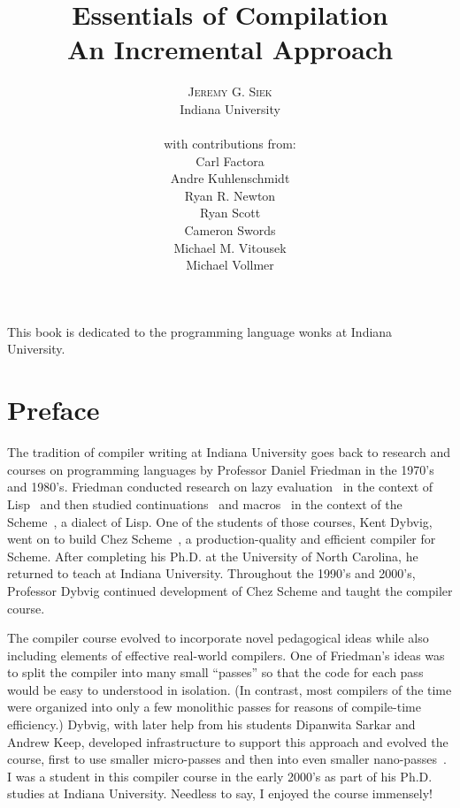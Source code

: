 \documentclass[11pt]{book}
\title{\Huge \textbf{Essentials of Compilation} \\
  \huge An Incremental Approach}
\author{\textsc{Jeremy G. Siek} \\
  Indiana University \\
  \\
  with contributions from: \\
  Carl Factora \\
  Andre Kuhlenschmidt \\
  Ryan R. Newton \\
  Ryan Scott \\
  Cameron Swords \\
  Michael M. Vitousek \\
  Michael Vollmer 
   }
\newenvironment{dedication}
{
   \cleardoublepage
   \thispagestyle{empty}
   \vspace*{\stretch{1}}
   \hfill\begin{minipage}[t]{0.66\textwidth}
   \raggedright
}
{
   \end{minipage}
   \vspace*{\stretch{3}}
   \clearpage
}
\begin{document}
\frontmatter
\maketitle

\begin{dedication}
This book is dedicated to the programming language wonks at Indiana
University.
\end{dedication}

\tableofcontents
\listoffigures

\mainmatter

\chapter*{Preface}

The tradition of compiler writing at Indiana University goes back to
research and courses on programming languages by Professor Daniel
Friedman in the 1970's and 1980's. Friedman conducted research on lazy
evaluation~\citep{Friedman:1976aa} in the context of
Lisp~\citep{McCarthy:1960dz} and then studied
continuations~\citep{Felleisen:kx} and
macros~\citep{Kohlbecker:1986dk} in the context of the
Scheme~\citep{Sussman:1975ab}, a dialect of Lisp.  One of the students
of those courses, Kent Dybvig, went on to build Chez
Scheme~\citep{Dybvig:2006aa}, a production-quality and efficient
compiler for Scheme. After completing his Ph.D. at the University of
North Carolina, he returned to teach at Indiana University.
Throughout the 1990's and 2000's, Professor Dybvig continued
development of Chez Scheme and taught the compiler course.

The compiler course evolved to incorporate novel pedagogical ideas
while also including elements of effective real-world compilers.  One
of Friedman's ideas was to split the compiler into many small
``passes'' so that the code for each pass would be easy to understood
in isolation.  (In contrast, most compilers of the time were organized
into only a few monolithic passes for reasons of compile-time
efficiency.)  Dybvig, with later help from his students Dipanwita
Sarkar and Andrew Keep, developed infrastructure to support this
approach and evolved the course, first to use smaller micro-passes and
then into even smaller
nano-passes~\citep{Sarkar:2004fk,Keep:2012aa}. I was a student in this
compiler course in the early 2000's as part of his Ph.D. studies at
Indiana University. Needless to say, I enjoyed the course immensely!
\end{document}
